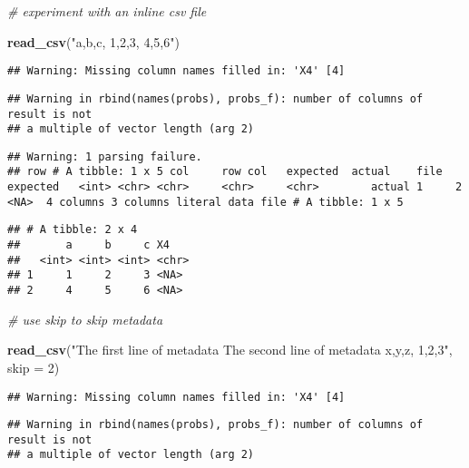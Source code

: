 \documentclass[]{article}
\newenvironment{Shaded}{\begin{snugshade}}{\end{snugshade}}
\newcommand{\KeywordTok}[1]{\textcolor[rgb]{0.13,0.29,0.53}{\textbf{#1}}}
\newcommand{\DataTypeTok}[1]{\textcolor[rgb]{0.13,0.29,0.53}{#1}}
\newcommand{\DecValTok}[1]{\textcolor[rgb]{0.00,0.00,0.81}{#1}}
\newcommand{\StringTok}[1]{\textcolor[rgb]{0.31,0.60,0.02}{#1}}
\newcommand{\CommentTok}[1]{\textcolor[rgb]{0.56,0.35,0.01}{\textit{#1}}}
\newcommand{\NormalTok}[1]{#1}
\begin{document}
\begin{Shaded}
\begin{Highlighting}[]
\CommentTok{# experiment with an inline csv file}

\KeywordTok{read_csv}\NormalTok{(}\StringTok{"a,b,c,}
\StringTok{         1,2,3,}
\StringTok{         4,5,6"}\NormalTok{)}
\end{Highlighting}
\end{Shaded}

\begin{verbatim}
## Warning: Missing column names filled in: 'X4' [4]
\end{verbatim}

\begin{verbatim}
## Warning in rbind(names(probs), probs_f): number of columns of result is not
## a multiple of vector length (arg 2)
\end{verbatim}

\begin{verbatim}
## Warning: 1 parsing failure.
## row # A tibble: 1 x 5 col     row col   expected  actual    file         expected   <int> <chr> <chr>     <chr>     <chr>        actual 1     2 <NA>  4 columns 3 columns literal data file # A tibble: 1 x 5
\end{verbatim}

\begin{verbatim}
## # A tibble: 2 x 4
##       a     b     c X4   
##   <int> <int> <int> <chr>
## 1     1     2     3 <NA> 
## 2     4     5     6 <NA>
\end{verbatim}

\begin{Shaded}
\begin{Highlighting}[]
\CommentTok{# use skip to skip metadata}

\KeywordTok{read_csv}\NormalTok{(}\StringTok{"The first line of metadata}
\StringTok{         The second line of metadata}
\StringTok{         x,y,z,}
\StringTok{         1,2,3"}\NormalTok{, }\DataTypeTok{skip =} \DecValTok{2}\NormalTok{)}
\end{Highlighting}
\end{Shaded}

\begin{verbatim}
## Warning: Missing column names filled in: 'X4' [4]
\end{verbatim}

\begin{verbatim}
## Warning in rbind(names(probs), probs_f): number of columns of result is not
## a multiple of vector length (arg 2)
\end{verbatim}
\end{document}
